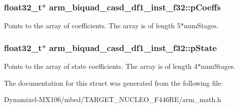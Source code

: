 \subsubsection[{\texorpdfstring{p\+Coeffs}{pCoeffs}}]{\setlength{\rightskip}{0pt plus 5cm}float32\+\_\+t$\ast$ arm\+\_\+biquad\+\_\+casd\+\_\+df1\+\_\+inst\+\_\+f32\+::p\+Coeffs}\hypertarget{structarm__biquad__casd__df1__inst__f32_af9df3820576fb921809d1462c9c6d16c}{}\label{structarm__biquad__casd__df1__inst__f32_af9df3820576fb921809d1462c9c6d16c}
Points to the array of coefficients. The array is of length 5$\ast$num\+Stages. 
\subsubsection[{\texorpdfstring{p\+State}{pState}}]{\setlength{\rightskip}{0pt plus 5cm}float32\+\_\+t$\ast$ arm\+\_\+biquad\+\_\+casd\+\_\+df1\+\_\+inst\+\_\+f32\+::p\+State}\hypertarget{structarm__biquad__casd__df1__inst__f32_a8c245d79e0d8cfabc82409d4b54fb682}{}\label{structarm__biquad__casd__df1__inst__f32_a8c245d79e0d8cfabc82409d4b54fb682}
Points to the array of state coefficients. The array is of length 4$\ast$num\+Stages. 

The documentation for this struct was generated from the following file\+:\begin{DoxyCompactItemize}
\item 
Dynamixel-\/\+M\+X106/mbed/\+T\+A\+R\+G\+E\+T\+\_\+\+N\+U\+C\+L\+E\+O\+\_\+\+F446\+R\+E/arm\+\_\+math.\+h\end{DoxyCompactItemize}
